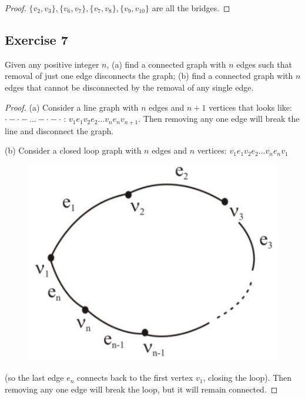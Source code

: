 \documentclass[14pt]{extarticle}
\begin{document}
\begin{proof}
\(\{v_2, v_3\}, \{v_6, v_7\}, \{v_7, v_8\}, \{v_9, v_{10}\}\) are all the bridges.
\end{proof}

\subsection{Exercise 7}
Given any positive integer \(n\), (a) find a connected graph with \(n\) edges such that removal of just one edge 
disconnects the graph; (b) find a connected graph with \(n\) edges that cannot be disconnected by the removal of any 
single edge.

\begin{proof}
(a) Consider a line graph with \(n\) edges and \(n+1\) vertices that looks like: \\\(\cdot-\cdot-\ldots-\cdot-\cdot\) 
: \(v_1e_1v_2e_2 \ldots v_ne_nv_{n+1}\). Then removing any one edge will break the line and disconnect the graph.

(b) Consider a closed loop graph with \(n\) edges and \(n\) vertices: \(v_1e_1v_2e_2 \ldots v_ne_nv_1\) 

\begin{figure}[ht!]
\centering
\includegraphics[scale=0.2]{../images/10.1.7.png}
\end{figure}

(so the last edge \(e_n\) connects back to the first vertex \(v_1\), closing the loop). Then removing any one edge will 
break the loop, but it will remain connected.
\end{proof}
\end{document}
